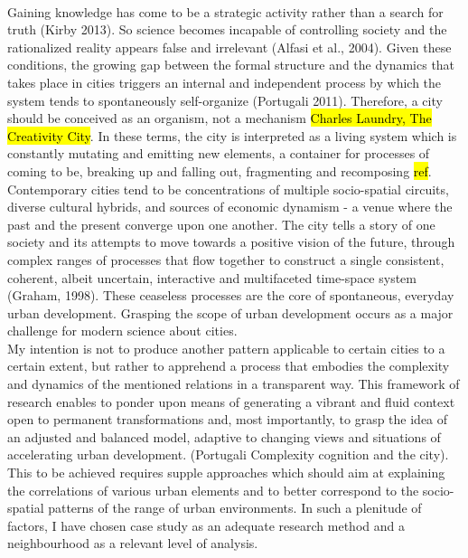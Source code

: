 \documentclass[11pt]{report}
\begin{document}
\\
Gaining knowledge has come to be a strategic activity rather than a search for truth (Kirby 2013). So science becomes incapable of controlling society and the rationalized reality appears false and irrelevant (Alfasi et al., 2004). Given these conditions, the growing gap between the formal structure and the dynamics that takes place in cities triggers an internal and independent process by which the system tends to spontaneously self-organize (Portugali 2011). Therefore, a city should be conceived as an organism, not a mechanism \hl{Charles Laundry, The Creativity City}. In these terms, the city is interpreted as a living system which is constantly mutating and emitting new elements, a container for processes of coming to be, breaking up and falling out, fragmenting and recomposing \hl{ref}. Contemporary cities tend to be concentrations of multiple socio-spatial circuits, diverse cultural hybrids, and sources of economic dynamism - a venue where the past and the present converge upon one another. The city tells a story of one society and its attempts to move towards a positive vision of the future, through complex ranges of processes that flow together to construct a single consistent, coherent, albeit uncertain, interactive and multifaceted time-space system (Graham, 1998). These ceaseless processes are the core of spontaneous, everyday urban development. Grasping the scope of urban development occurs as a major challenge for modern science about cities.
\\
My intention is not to produce another pattern applicable to certain cities to a certain extent, but rather to apprehend a process that embodies the complexity and dynamics of the mentioned relations in a transparent way.  This framework of research enables to ponder upon means of generating a vibrant and fluid context open to permanent transformations and, most importantly, to grasp the idea of an adjusted and balanced model, adaptive to changing views and situations of accelerating urban development. (Portugali Complexity cognition and the city). This to be achieved requires supple approaches which should aim at explaining the correlations of various urban elements and to better correspond to the socio-spatial patterns of the range of urban environments. In such a plenitude of factors, I have chosen case study as an adequate research method and a neighbourhood as a relevant level of analysis.
\\
\end{document}
